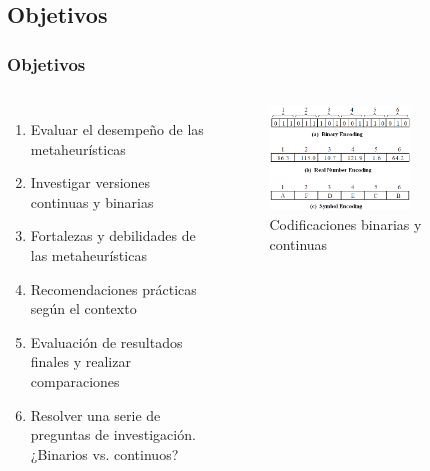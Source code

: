 \note{

}

\note{

}

\subsection{Objetivos}
\begin{frame}
  \frametitle{Objetivos}
  \begin{columns}
    \begin{enumerate}
      \item Evaluar el desempeño de las metaheurísticas
      \item Investigar versiones continuas y binarias
      \item Fortalezas y debilidades de las metaheurísticas
      \item Recomendaciones prácticas según el contexto
      \item Evaluación de resultados finales y realizar comparaciones
      \item Resolver una serie de preguntas de investigación. ¿Binarios vs. continuos?
    \end{enumerate}
    \begin{figure}
      \begin{center}
        \includegraphics[width=0.7\textwidth]{imagenes/chapter1/real_vs_bin.png}
      \end{center}
      \caption{Codificaciones binarias y continuas\footnotemark[1]}
    \end{figure}
  \end{columns}
\end{frame}

\note{

}

